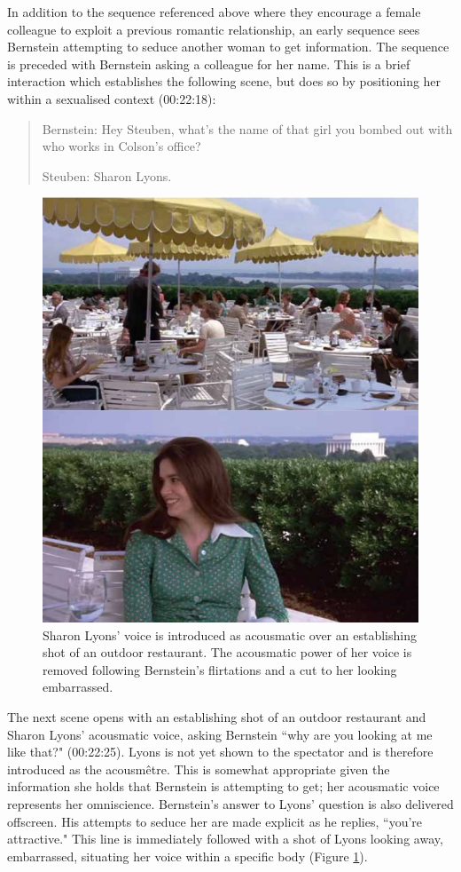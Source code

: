 In addition to the sequence referenced above where they encourage a female colleague to exploit a previous romantic relationship, an early sequence sees Bernstein attempting to seduce another woman to get information.
The sequence is preceded with Bernstein asking a colleague for her name.
This is a brief interaction which establishes the following scene, but does so by positioning her within a sexualised context (00:22:18):
\begin{quote}
Bernstein: Hey Steuben, what's the name of that girl you bombed out with who works in Colson's office?

Steuben: Sharon Lyons.
\end{quote}
\begin{figure}
    \centering
    \includegraphics[width=1\linewidth]{img/president-sharon-date.pdf}
    \caption{Sharon Lyons' voice is introduced as acousmatic over an establishing shot of an outdoor restaurant. The acousmatic power of her voice is removed following Bernstein's flirtations and a cut to her looking embarrassed.}
    \label{fig:president-sharon-date}
\end{figure}
The next scene opens with an establishing shot of an outdoor restaurant and Sharon Lyons' acousmatic voice, asking Bernstein ``why are you looking at me like that?" (00:22:25).
Lyons is not yet shown to the spectator and is therefore introduced as the acousmêtre.
This is somewhat appropriate given the information she holds that Bernstein is attempting to get; her acousmatic voice represents her omniscience.
Bernstein's answer to Lyons' question is also delivered offscreen.
His attempts to seduce her are made explicit as he replies, ``you're attractive."
This line is immediately followed with a shot of Lyons looking away, embarrassed, situating her voice within a specific body (Figure \ref{fig:president-sharon-date}).

